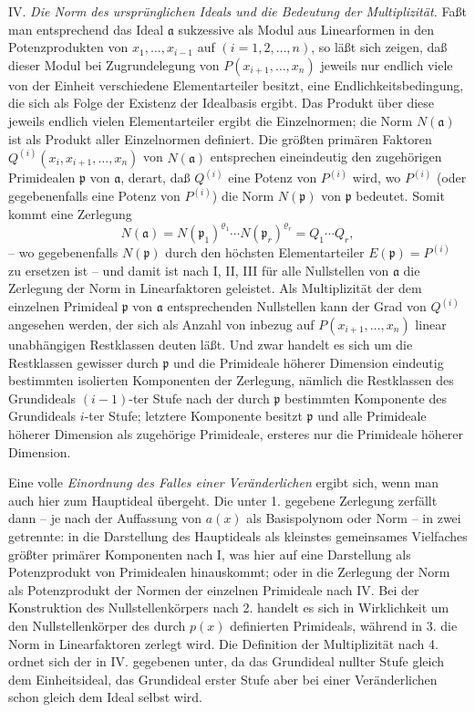 IV. \emph{Die Norm des ursprünglichen Ideals und die Bedeutung der Multiplizität.} Faßt man entsprechend das Ideal $\mathfrak a$ sukzessive als Modul aus Linearformen in den Potenzprodukten von $x_1,\ldots,x_{i-1}$ auf $(i=1,2,\ldots,n)$, so läßt sich zeigen, daß dieser Modul bei Zugrundelegung von $P(x_{i+1},\ldots,x_n)$ jeweils nur endlich viele von der Einheit verschiedene Elementarteiler besitzt, eine Endlichkeitsbedingung, die sich als Folge der Existenz der Idealbasis ergibt. Das Produkt über diese jeweils endlich vielen Elementarteiler ergibt die Einzelnormen; die Norm $N(\mathfrak a)$ ist als Produkt aller Einzelnormen definiert. Die größten primären Faktoren $Q^{(i)}(x_i,x_{i+1},\ldots,x_n)$ von $N(\mathfrak a)$ entsprechen eineindeutig den zugehörigen Primidealen $\mathfrak p$ von $\mathfrak a$, derart, daß $Q^{(i)}$ eine Potenz von $P^{(i)}$ wird, wo $P^{(i)}$ (oder gegebenenfalls eine Potenz von $P^{(i)}$) die Norm $N(\mathfrak p)$ von $\mathfrak p$ bedeutet. Somit kommt eine Zerlegung
\[
 N(\mathfrak a)=N(\mathfrak p_1)^{\varrho_1}\cdots N(\mathfrak p_r)^{\varrho_r}=Q_1\cdots Q_r,
\]
-- wo gegebenenfalls $N(\mathfrak p)$ durch den höchsten Elementarteiler $E(\mathfrak p)=P^{(i)}$ zu ersetzen ist -- und damit ist nach I, II, III für alle Nullstellen von $\mathfrak a$ die Zerlegung der Norm in Linearfaktoren geleistet. Als Multiplizität der dem einzelnen Primideal $\mathfrak p$ von $\mathfrak a$ entsprechenden Nullstellen kann der Grad von $Q^{(i)}$ angesehen werden, der sich als Anzahl von inbezug auf $P(x_{i+1},\ldots,x_n)$ linear unabhängigen Restklassen deuten läßt. Und zwar handelt es sich um die Restklassen gewisser durch $\mathfrak p$ und die Primideale höherer Dimension eindeutig bestimmten isolierten Komponenten der Zerlegung, nämlich die Restklassen des Grundideals $(i-1)$-ter Stufe nach der durch $\mathfrak p$ bestimmten Komponente des Grundideals $i$-ter Stufe; letztere Komponente besitzt $\mathfrak p$ und alle Primideale höherer Dimension als zugehörige Primideale, ersteres nur die Primideale höherer Dimension.

Eine volle \emph{Einordnung des Falles einer Veränderlichen} ergibt sich, wenn man auch hier zum Hauptideal übergeht. Die unter 1. gegebene Zerlegung zerfällt dann -- je nach der Auffassung von $a(x)$ als Basispolynom oder Norm -- in zwei getrennte: in die Darstellung des Hauptideals als kleinstes gemeinsames Vielfaches größter primärer Komponenten nach I, was hier auf eine Darstellung als Potenzprodukt von Primidealen hinauskommt; oder in die Zerlegung der Norm als Potenzprodukt der Normen der einzelnen Primideale nach IV. Bei der Konstruktion des Nullstellenkörpers nach 2. handelt es sich in Wirklichkeit um den Nullstellenkörper des durch $p(x)$ definierten Primideals, während in 3. die Norm in Linearfaktoren zerlegt wird. Die Definition der Multiplizität nach 4. ordnet sich der in IV. gegebenen unter, da das Grundideal nullter Stufe gleich dem Einheitsideal, das Grundideal erster Stufe aber bei einer Veränderlichen schon gleich dem Ideal selbst wird.

